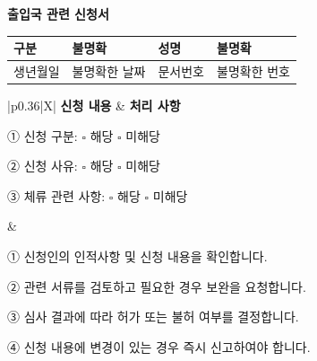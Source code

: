 \documentclass[UTF8,10pt,a4paper,fontset=fandol]{ctexart}
\newcommand{\fieldvalue}[1]{#1}
\newcommand{\handwritten}[1]{#1}
\begin{document}
\newpage


\begin{center}
\textbf{출입국 관련 신청서}
\end{center}

\noindent
\begin{tabularx}{\textwidth}{|l|X|l|X|}
\hline
구분 & 
\fieldvalue{\handwritten{불명확}} &
성명 &
\fieldvalue{\handwritten{불명확}} \\
\hline
생년월일 &
\fieldvalue{\handwritten{불명확한 날짜}} &
문서번호 &
\fieldvalue{\handwritten{불명확한 번호}} \\
\hline
\end{tabularx}

\vspace{0.5em}

\noindent
\begin{tabularx}{\textwidth}{|p{0.36\textwidth}|X|}
\hline
\textbf{신청 내용} &
\textbf{처리 사항} \\
\hline
\begin{minipage}[t]{\linewidth}
① 신청 구분: \(\square\) 해당  \(\square\) 미해당

② 신청 사유: \(\square\) 해당  \(\square\) 미해당

③ 체류 관련 사항: \(\square\) 해당  \(\square\) 미해당
\end{minipage}
&
\begin{minipage}[t]{\linewidth}
① 신청인의 인적사항 및 신청 내용을 확인합니다.

② 관련 서류를 검토하고 필요한 경우 보완을 요청합니다.

③ 심사 결과에 따라 허가 또는 불허 여부를 결정합니다.

④ 신청 내용에 변경이 있는 경우 즉시 신고하여야 합니다.
\end{minipage}
\\
\hline
\end{tabularx}

\vspace{0.5em}
\end{document}
